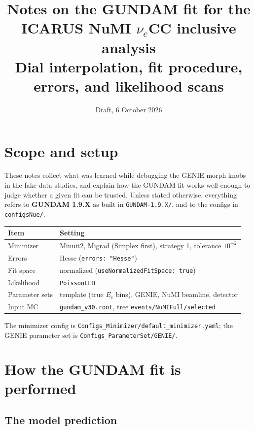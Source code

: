 \documentclass[11pt]{article}
\title{Notes on the GUNDAM fit for the ICARUS NuMI $\nu_e$CC inclusive analysis\\[4pt]
\large Dial interpolation, fit procedure, errors, and likelihood scans}
\author{}
\date{Draft, 6 October 2026}
\newcommand{\code}[1]{\texttt{#1}}
\begin{document}
\maketitle
\tableofcontents

\section{Scope and setup}

These notes collect what was learned while debugging the GENIE morph knobs in the
fake-data studies, and explain how the GUNDAM fit works well enough to judge
whether a given fit can be trusted. Unless stated otherwise, everything refers to
\textbf{GUNDAM 1.9.X} as built in \code{GUNDAM-1.9.X/}, and to the configs in
\code{configsNue/}.

\begin{center}
\begin{tabular}{@{}ll@{}}
\toprule
Item & Setting \\
\midrule
Minimizer & Minuit2, Migrad (Simplex first), strategy 1, tolerance $10^{-2}$ \\
Errors & Hesse (\code{errors: "Hesse"}) \\
Fit space & normalized (\code{useNormalizedFitSpace: true}) \\
Likelihood & \code{PoissonLLH} \\
Parameter sets & template (true $E_e$ bins), GENIE, NuMI beamline, detector \\
Input MC & \code{gundam\_v30.root}, tree \code{events/NuMIFull/selected} \\
\bottomrule
\end{tabular}
\end{center}

The minimizer config is \code{Configs\_Minimizer/default\_minimizer.yaml}; the GENIE
parameter set is \code{Configs\_ParameterSet/GENIE/}.

\section{How the GUNDAM fit is performed}

\subsection{The model prediction}
\end{document}

